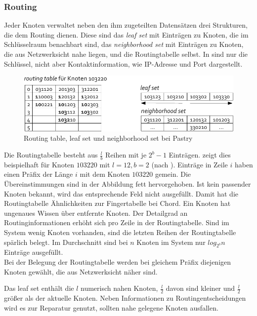 \subsubsection{Routing}
Jeder Knoten verwaltet neben den ihm zugeteilten Datensätzen drei Strukturen, die dem Routing dienen. Diese sind das \emph{leaf set} mit Einträgen zu Knoten, die im Schlüsselraum benachbart sind, das \emph{neighborhood set} mit Einträgen zu Knoten, die aus Netzwerksicht nahe liegen, und die Routingtabelle selbst. In  sind nur die Schlüssel, nicht aber Kontaktinformation, wie IP-Adresse und Port dargestellt.

\begin{figure}[htbp]
\centering
\includegraphics{grafics/pastry_routing_table.pdf}
\caption{Routing table, leaf set und neighborhood set bei Pastry}
\label{fig:pastry_routing_table}
\end{figure}

Die Routingtabelle besteht aus $\frac{l}{b}$ Reihen mit je $2^b -1$ Einträgen.  zeigt dies beispielhaft für Knoten $103220$ mit $l=12, b=2$ (nach \cite{Goetz2005}). Einträge in Zeile $i$ haben einen Präfix der Länge $i$ mit dem Knoten $103220$ gemein. Die Übereinstimmungen sind in der Abbildung fett hervorgehoben. Ist kein passender Knoten bekannt, wird das entsprechende Feld nicht ausgefüllt. Damit hat die Routingtabelle Ähnlichkeiten zur Fingertabelle bei Chord. Ein Knoten hat ungenaues Wissen über entfernte Knoten. Der Detailgrad an Routinginformationen erhöht sich pro Zeile in der Routingtabelle. Sind im System wenig Knoten vorhanden, sind die letzten Reihen der Routingtabelle spärlich belegt. Im Durchschnitt sind bei $n$ Knoten im System nur $log_{2^b} n$ Einträge ausgefüllt.\\
Bei der Belegung der Routingtabelle werden bei gleichem Präfix diejenigen Knoten gewählt, die aus Netzwerksicht näher sind.

Das leaf set enthält die $l$ numerisch nahen Knoten, $\frac{l}{2}$ davon sind kleiner und $\frac{l}{2}$ größer als der aktuelle Knoten. Neben Informationen zu Routingentscheidungen wird es zur Reparatur genutzt, sollten nahe gelegene Knoten ausfallen.

